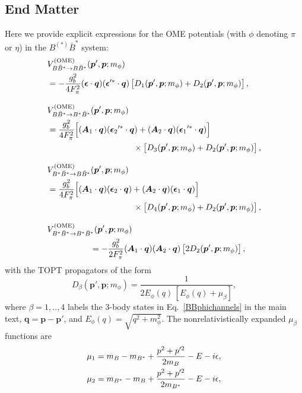 \documentclass[aps,prl,showpacs,amsmath,twocolumn,superscriptaddress,floatfix,nofootinbib,notitlepage]{revtex4-2}
\newcommand{\vep}{{\bm p}}
\newcommand{\veq}{{\bm q}}
\newcommand{\veA}{{\bm A}}
\newcommand{\be}{\begin{equation}}
\newcommand{\ee}{\end{equation}}
\newcommand{\mG}{m_\phi}
\newcommand{\EG}{E_\phi}
\newcommand{\veep}{{\bm \epsilon}}
\newcommand{\veepst}{{\bm \epsilon}^{\prime*}}
\newcommand{\VOME}{V^{\rm (OME)}}
\begin{document}
\begin{appendix}
\section*{End Matter}
Here we provide explicit expressions for the OME potentials (with $\phi$ denoting $\pi$ or $\eta$) in the $B^{(*)}\bar{B}^*$ system:
\begin{align}
&\VOME_{B\bar{B}^*\to B\bar{B}^*}(\vep',\vep;m_\phi)\label{VBBstBBst}\\
&=-\frac{g_b^2}{4F_\pi^2}(\veep\cdot \veq)(\veepst\cdot \veq) \left[D_{1}(\vep',\vep;m_\phi)+D_{2}(\vep',\vep;m_\phi)\right],\notag
\\[3mm]
&\VOME_{B\bar{B}^*\to B^*\bar{B}^*}(\vep',\vep;m_\phi)\label{VBBstBstBst}\\
&=\frac{g_b^2}{4F_\pi^2}\Big[({\veA_1}\cdot \veq)({\veep_2}^{\prime *}\cdot \veq)+({\veA_2}\cdot \veq)({\veep_1}^{\prime *}\cdot \veq)\Big] \notag\\
&\hspace*{0.3\columnwidth}\times\left[D_{3}(\vep',\vep;m_\phi)+D_{2}(\vep',\vep;m_\phi)\right],\notag
\\[3mm]
&\VOME_{B^*\bar{B}^*\to B\bar{B}^*}(\vep',\vep;m_\phi)\label{VBstBstBBst}\\
&=\frac{g_b^2}{4F_\pi^2}\Big[({\veA_1}\cdot \veq)({\veep_2}\cdot \veq)+({\veA_2}\cdot \veq)({\veep_1}\cdot \veq)\Big] \notag\\
&\hspace*{0.3\columnwidth}\times\left[D_{4}(\vep',\vep;m_\phi)+D_{2}(\vep',\vep;m_\phi)\right],
\notag\\[3mm]
&\VOME_{B^*\bar{B}^*\to B^*\bar{B}^*}(\vep',\vep;m_\phi)\label{VBstBstBstBst}\\
&\hspace*{0.15\columnwidth}=-\frac{g_b^2}{2F_\pi^2}(\veA_1\cdot \veq)(\veA_2\cdot \veq) \left[ 2D_{2}(\vep',\vep;m_\phi)\right], \notag
\end{align}
with the TOPT propagators of the form
\be
D_\beta(\vep',\vep;\mG)=\frac1{2\EG(q)\,[\EG (q)+\mu_\beta]},
\label{eq:Dbeta}
\ee
where $\beta=1,..,4$ labels the 3-body states in Eq.~\eqref{BBphichannels} in the main text, $\veq=\vep-\vep'$, and $\EG(q)=\sqrt{q^2+\mG^2}$. The nonrelativistically expanded $\mu_\beta$ functions are
\begin{align}
\mu_1&= m_B-m_{B^*}+\frac{p^2+p^{\prime2}}{2m_B}-E-i\epsilon, \notag \\
\mu_2&= m_{B^*}-m_B+\frac{p^2+p^{\prime2}}{2m_{B^*}}-E-i\epsilon, \notag\\

\end{align}
\end{appendix}
\end{document}
